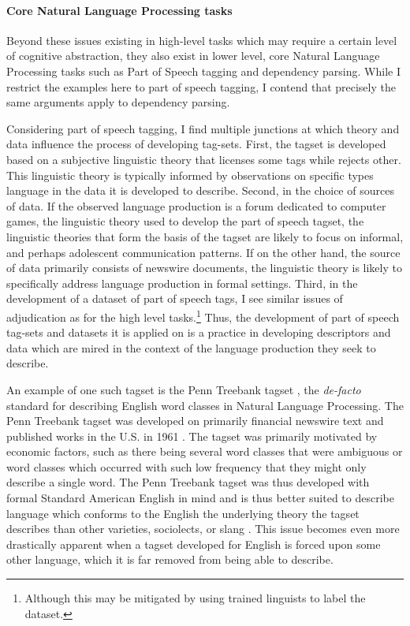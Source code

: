 \paragraph{Core Natural Language Processing tasks}
Beyond these issues existing in high-level tasks which may require a certain level of cognitive abstraction, they also exist in lower level, core Natural Language Processing tasks such as Part of Speech tagging and dependency parsing. While I restrict the examples here to part of speech tagging, I contend that precisely the same arguments apply to dependency parsing.

Considering part of speech tagging, I find multiple junctions at which theory and data influence the process of developing tag-sets. First, the tagset is developed based on a subjective linguistic theory that licenses some tags while rejects other. This linguistic theory is typically informed by observations on specific types language in the data it is developed to describe. Second, in the choice of sources of data. If the observed language production is a forum dedicated to computer games, the linguistic theory used to develop the part of speech tagset, the linguistic theories that form the basis of the tagset are likely to focus on informal, and perhaps adolescent communication patterns. If on the other hand, the source of data primarily consists of newswire documents, the linguistic theory is likely to specifically address language production in formal settings. Third, in the development of a dataset of part of speech tags, I see similar issues of adjudication as for the high level tasks.\footnote{Although this may be mitigated by using trained linguists to label the dataset.}
Thus, the development of part of speech tag-sets and datasets it is applied on is a practice in developing descriptors and data which are mired in the context of the language production they seek to describe.

An example of one such tagset is the Penn Treebank tagset \citep{Marcus:1993}, the \textit{de-facto} standard for describing English word classes in Natural Language Processing. The Penn Treebank tagset was developed on primarily financial newswire text and published works in the U.S. in 1961 \citep{Francis:1982}. The tagset was primarily motivated by economic factors, such as there being several word classes that were ambiguous or word classes which occurred with such low frequency that they might only describe a single word. The Penn Treebank tagset was thus developed with formal Standard American English in mind and is thus better suited to describe language which conforms to the English the underlying theory the tagset describes than other varieties, sociolects, or slang \citep{Blodgett:2016,Jorgensen:2016}.
This issue becomes even more drastically apparent when a tagset developed for English is forced upon some other language, which it is far removed from being able to describe.

